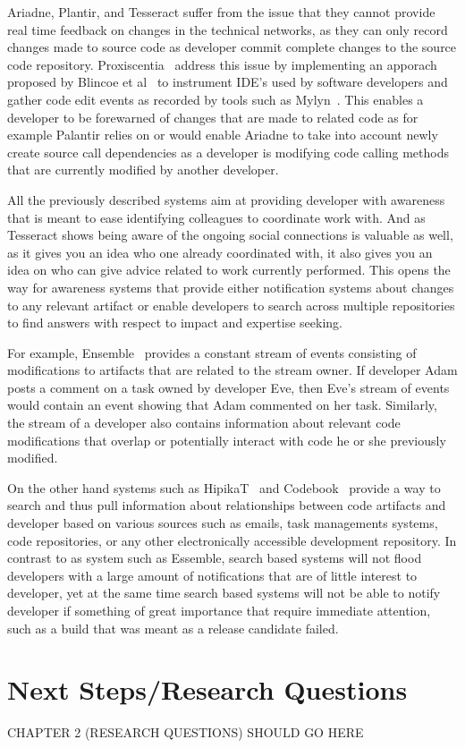 Ariadne, Plantir, and Tesseract suffer from the issue that they cannot provide real time feedback on changes in the technical networks, as they can only record changes made to source code as developer commit complete changes to the source code repository. 
Proxiscentia~\cite{borici:chase:2012} address this issue by implementing an apporach proposed by Blincoe et al~\cite{blincoe:cscw:2012} to instrument IDE's used by software developers and gather code edit events as recorded by tools such as Mylyn~\cite{kersten:aosd:2005}.
This enables a developer to be forewarned of changes that are made to related code as for example Palantir relies on or would enable Ariadne to take into account newly create source call dependencies as a developer is modifying code calling methods that are currently modified by another developer.

All the previously described systems aim at providing developer with awareness that is meant to ease identifying colleagues to coordinate work with.
And as Tesseract shows being aware of the ongoing social connections is valuable as well, as it gives you an idea who one already coordinated with, it also gives you an idea on who can give advice related to work currently performed.
This opens the way for awareness systems that provide either notification systems about changes to any relevant artifact or enable developers to search across multiple repositories to find answers with respect to impact and expertise seeking.

For example, Ensemble~\cite{xiang:rsse:2008} provides a constant stream of events consisting of modifications to artifacts that are related to the stream owner.
If developer Adam posts a comment on a task owned by developer Eve, then Eve's stream of events would contain an event showing that Adam commented on her task.
Similarly, the stream of a developer also contains information about relevant code modifications that overlap or potentially interact with code he or she previously modified.

On the other hand systems such as HipikaT~\cite{cubranic:tse:2005} and Codebook~\cite{begel:icse:2010} provide a way to search and thus pull information about relationships between code artifacts and developer based on various sources such as emails, task managements systems, code repositories, or any other electronically accessible development repository.
In contrast to as system such as Essemble, search based systems will not flood developers with a large amount of notifications that are of little interest to developer, yet at the same time search based systems will not be able to notify developer if something of great importance that require immediate attention, such as a build that was meant as a release candidate failed.

\section{Next Steps/Research Questions}

CHAPTER 2 (RESEARCH QUESTIONS) SHOULD GO HERE
